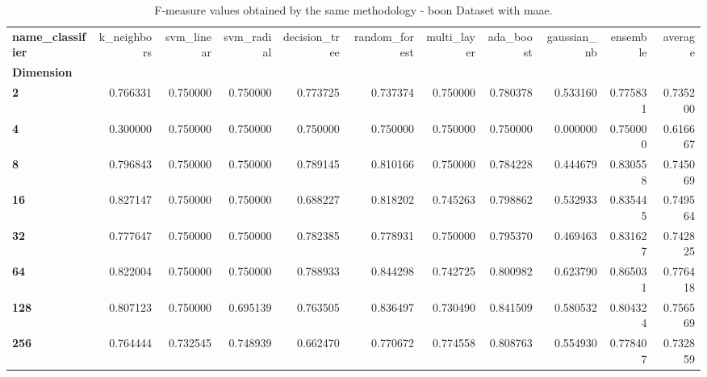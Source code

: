 \begin{table}
\centering
\caption{F-measure values obtained by the same methodology - boon Dataset with maae.}
\label{f-measure_boon_maae-reproduction}
\begin{tabular}{lrrrrrrrrrr}
\toprule
\textbf{name\_classifier} &  k\_neighbors &  svm\_linear &  svm\_radial &  decision\_tree &  random\_forest &  multi\_layer &  ada\_boost &  gaussian\_nb &  ensemble &   average \\
\textbf{Dimension} &              &             &             &                &                &              &            &              &           &           \\
\midrule
\textbf{2        } &     0.766331 &    0.750000 &    0.750000 &       0.773725 &       0.737374 &     0.750000 &   0.780378 &     0.533160 &  0.775831 &  0.735200 \\
\textbf{4        } &     0.300000 &    0.750000 &    0.750000 &       0.750000 &       0.750000 &     0.750000 &   0.750000 &     0.000000 &  0.750000 &  0.616667 \\
\textbf{8        } &     0.796843 &    0.750000 &    0.750000 &       0.789145 &       0.810166 &     0.750000 &   0.784228 &     0.444679 &  0.830558 &  0.745069 \\
\textbf{16       } &     0.827147 &    0.750000 &    0.750000 &       0.688227 &       0.818202 &     0.745263 &   0.798862 &     0.532933 &  0.835445 &  0.749564 \\
\textbf{32       } &     0.777647 &    0.750000 &    0.750000 &       0.782385 &       0.778931 &     0.750000 &   0.795370 &     0.469463 &  0.831627 &  0.742825 \\
\textbf{64       } &     0.822004 &    0.750000 &    0.750000 &       0.788933 &       0.844298 &     0.742725 &   0.800982 &     0.623790 &  0.865031 &  0.776418 \\
\textbf{128      } &     0.807123 &    0.750000 &    0.695139 &       0.763505 &       0.836497 &     0.730490 &   0.841509 &     0.580532 &  0.804324 &  0.756569 \\
\textbf{256      } &     0.764444 &    0.732545 &    0.748939 &       0.662470 &       0.770672 &     0.774558 &   0.808763 &     0.554930 &  0.778407 &  0.732859 \\
\bottomrule
\end{tabular}
\end{table}
